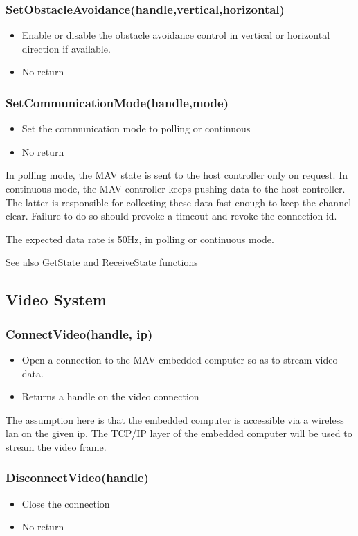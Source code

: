 \documentclass{article}
\begin{document}
\subsubsection{SetObstacleAvoidance(handle,vertical,horizontal)}
\begin{itemize}
\item Enable or disable the obstacle avoidance control in vertical or
horizontal direction if available.
\item No return
\end{itemize}

\subsubsection{SetCommunicationMode(handle,mode)}
\begin{itemize}
\item Set the communication mode to polling or continuous
\item No return
\end{itemize}
In polling mode, the MAV state is sent to the host controller only on request.
In continuous mode, the MAV controller keeps pushing data to the host
controller. The latter is responsible for collecting these data fast enough to
keep the channel clear. Failure to do so should provoke a timeout and revoke
the connection id.

The expected data rate is 50Hz, in polling or continuous mode.

See also GetState and ReceiveState functions

\subsection{Video System}

\subsubsection{ConnectVideo(handle, ip)}
\begin{itemize}
\item Open a connection to the MAV embedded computer so as to stream video
data.
\item Returns a handle on the video connection
\end{itemize}
The assumption here is that the embedded computer is accessible via a wireless
lan on the given ip. The TCP/IP layer of the embedded computer will be used to
stream the video frame.

\subsubsection{DisconnectVideo(handle)}
\begin{itemize}
\item Close the connection 
\item No return
\end{itemize}
\end{document}
